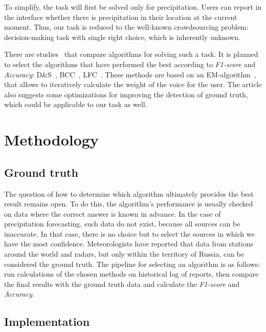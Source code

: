 \documentclass[conference]{IEEEtran}
\begin{document}
To simplify, the task will first be solved only for precipitation. Users can report in the interface whether there is precipitation in their location at the current moment. Thus, our task is reduced to the well-known crowdsourcing problem: decision-making task with single right choice, which is inherently unknown.

There are studies~\cite{zheng} that compare algorithms for solving such a task. It is planned to select the algorithms that have performed the best according to \textit{F1-score} and \textit{Accuracy}: D\&S~\cite{ds}, BCC~\cite{bcc}, LFC~\cite{lfc}. These methods are based on an EM-algorithm~\cite{em}, that allows to iteratively calculate the weight of the voice for the user. The article also suggests some optimizations for improving the detection of ground truth, which could be applicable to our task as well.

\section{Methodology}
\subsection{Ground truth}

The question of how to determine which algorithm ultimately provides the best result remains open. To do this, the algorithm's performance is usually checked on data where the correct answer is known in advance. In the case of precipitation forecasting, such data do not exist, because all sources can be inaccurate. In that case, there is no choice but to select the sources in which we have the most confidence. Meteorologists have reported that data from stations around the world and radars, but only within the territory of Russia, can be considered the ground truth. The pipeline for selecting an algorithm is as follows: run calculations of the chosen methods on historical log of reports, then compare the final results with the ground truth data and calculate the \textit{F1-score} and \textit{Accuracy}.

\subsection{Implementation}
\end{document}
